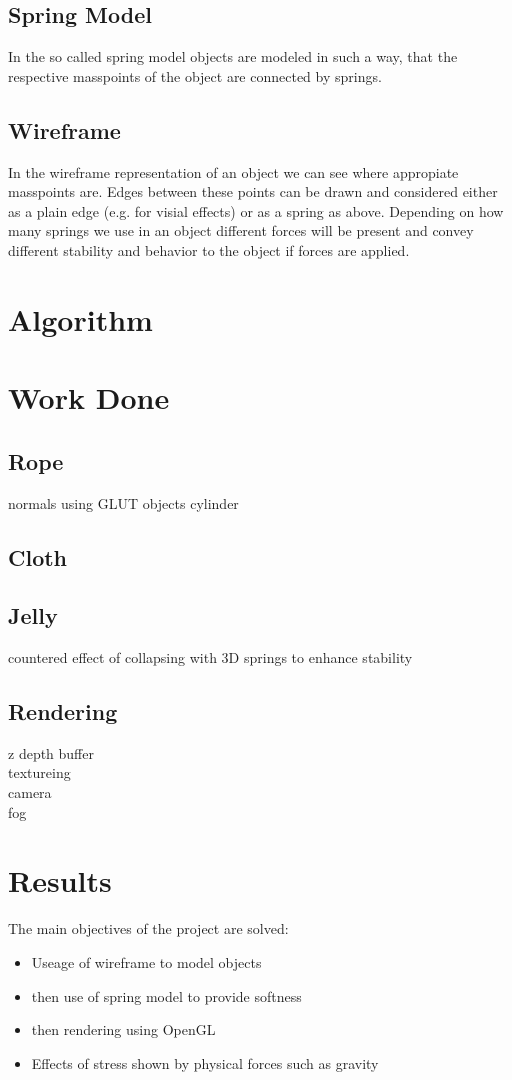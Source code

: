 \documentclass[11pt]{article}
\begin{document}
\subsection{Spring Model}
In the so called spring model objects are modeled in such a way, that the respective masspoints of the object are connected by springs.

\subsection{Wireframe}
In the wireframe representation of an object we can see where appropiate masspoints are. Edges between these points can be drawn and considered either as a plain edge (e.g. for visial effects) or as a spring as above. Depending on how many springs we use in an object different forces will be present and convey different stability and behavior to the object if forces are applied.
%
%
%
\section{Algorithm}

\section{Work Done}

\subsection{Rope}
normals using GLUT objects cylinder

\subsection{Cloth}

\subsection{Jelly}
countered effect of collapsing with 3D springs to enhance stability

\subsection{Rendering}
z depth buffer\\
textureing\\
camera\\
fog


\section{Results}
The main objectives of the project are solved:
\begin{itemize}
\item{Useage of wireframe to model objects}
\item{then use of spring model to provide softness}
\item{then rendering using OpenGL}
\item{Effects of stress shown by physical forces such as gravity}
\end{itemize}
\end{document}
